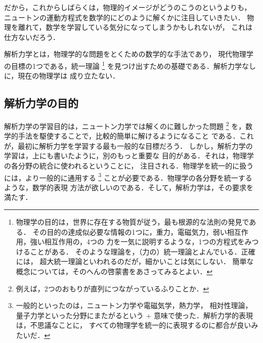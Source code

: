             だから，これからしばらくは，物理的イメージがどうのこうのというよりも，
            ニュートンの運動方程式を数学的にどのように解くかに注目していきたい．
            物理を離れて，数学を学習している気分になってしまうかもしれないが，
            これは仕方ないだろう．

            解析力学とは，物理学的な問題をとくための数学的な手法であり，
            現代物理学の目標の1つである，統一理論
                \footnote{
                    物理学の目的は，世界に存在する物質が従う，最も根源的な法則の発見である．
                    その目的の達成似必要な情報の1つに，重力，電磁気力，弱い相互作用，強い相互作用の，4つの
                    力を一気に説明するような，1つの方程式をみつけることがある．
                    そのような理論を，（力の）統一理論とよんでいる．正確には，
                    超大統一理論といわれるのだが，細かいことは気にしない．
                    簡単な概念については，そのへんの啓蒙書をあさってみるとよい．
                }
            を見つけ出すための基礎である．解析力学なしに，現在の物理学は
            成り立たない．

        \subsection{解析力学の目的}
            解析力学の学習目的は，ニュートン力学では解くのに難しかった問題
                \footnote{
                    例えば，2つのおもりが直列につながっているふりことか．
                }
            を，数学的手法を駆使することで，比較的簡単に解けるようになること
            である．これが，最初に解析力学を学習する最も一般的な目標だろう．
            しかし，解析力学の学習は，上にも書いたように，別のもっと重要な
            目的がある．それは，物理学の各分野の統合に使われるということに，
            注目される．物理学を統一的に扱うには，より一般的に通用する
                \footnote{
                    一般的といったのは，ニュートン力学や電磁気学，熱力学，
                    相対性理論，量子力学といった分野にまたがるという
          +          意味で使った．解析力学的表現は，不思議なことに，
                    すべての物理学を統一的に表現するのに都合が良いみたいだ．
                }
            ことが必要である．物理学の各分野を統一するような，数学的表現
            方法が欲しいのである．そして，解析力学は，その要求を満たす．

